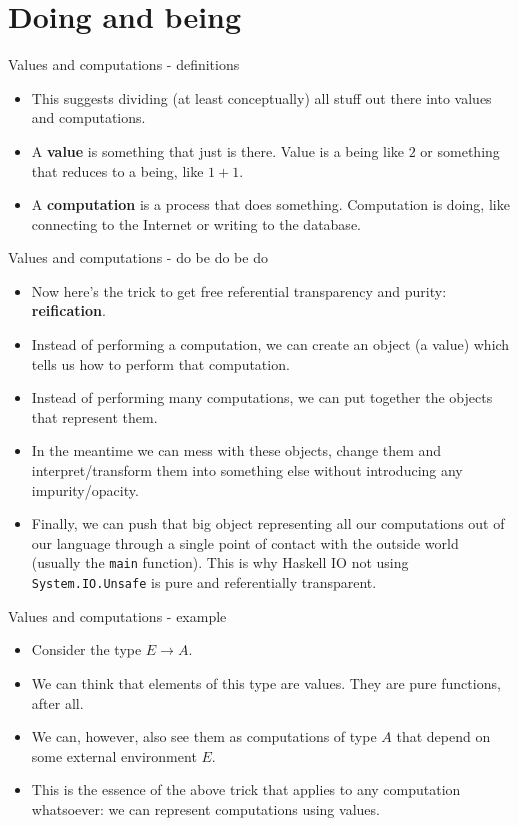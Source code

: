 \documentclass{beamer}
\begin{document}
\section{Doing and being}

\begin{frame}{Values and computations - definitions}
\begin{itemize}
	\item This suggests dividing (at least conceptually) all stuff out there into values and computations.
	\item A \textbf{value} is something that just is there. Value is a being like $2$ or something that reduces to a being, like $1 + 1$.
	\item A \textbf{computation} is a process that does something. Computation is doing, like connecting to the Internet or writing to the database.
\end{itemize}
\end{frame}

\begin{frame}{Values and computations - do be do be do}
\begin{itemize}
	\item Now here's the trick to get free referential transparency and purity: \textbf{reification}.
	\item Instead of performing a computation, we can create an object (a value) which tells us how to perform that computation.
	\item Instead of performing many computations, we can put together the objects that represent them.
	\item In the meantime we can mess with these objects, change them and interpret/transform them into something else without introducing any impurity/opacity.
	\item Finally, we can push that big object representing all our computations out of our language through a single point of contact with the outside world (usually the \texttt{main} function). This is why Haskell IO not using \texttt{System.IO.Unsafe} is pure and referentially transparent.
\end{itemize}
\end{frame}

\begin{frame}{Values and computations - example}
\begin{itemize}
	\item Consider the type $E \to A$.
	\item We can think that elements of this type are values. They are pure functions, after all.
	\item We can, however, also see them as computations of type $A$ that depend on some external environment $E$.
	\item This is the essence of the above trick that applies to any computation whatsoever: we can represent computations using values.
\end{itemize}
\end{frame}
\end{document}
